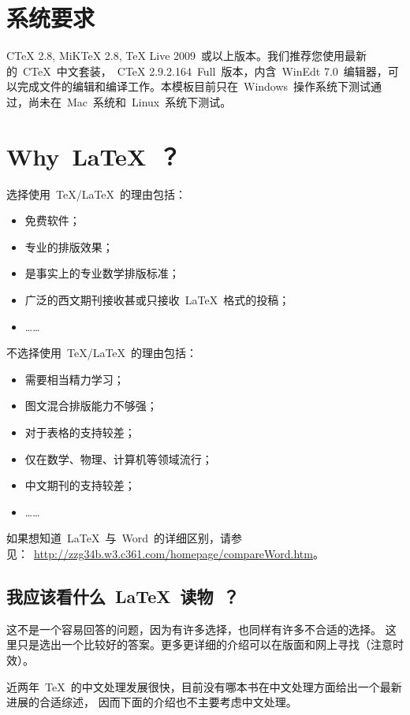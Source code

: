 \section{系统要求}

     CTeX 2.8, MiKTeX 2.8, TeX Live 2009~或以上版本。我们推荐您使用最新的~CTeX~中文套装，~CTeX 2.9.2.164~Full~版本，内含~WinEdt 7.0~编辑器，可以完成文件的编辑和编译工作。本模板目前只在~Windows~操作系统下测试通过，尚未在~Mac~系统和~Linux~系统下测试。

\section{Why~\LaTeX~？}

选择使用~\TeX/\LaTeX~的理由包括：
\begin{itemize}
\item 免费软件；
\item 专业的排版效果；
\item 是事实上的专业数学排版标准；
\item 广泛的西文期刊接收甚或只接收~\LaTeX~格式的投稿；
\item[] ……
\end{itemize}
不选择使用~\TeX/\LaTeX~的理由包括：
\begin{itemize}
\item 需要相当精力学习；
\item 图文混合排版能力不够强；
\item 对于表格的支持较差；
\item 仅在数学、物理、计算机等领域流行；
\item 中文期刊的支持较差；
\item[] ……
\end{itemize}

如果想知道~\LaTeX~与~Word~的详细区别，请参见：~\url{http://zzg34b.w3.c361.com/homepage/compareWord.htm}。

\subsection{我应该看什么~\LaTeX~读物~？}

这不是一个容易回答的问题，因为有许多选择，也同样有许多不合适的选择。
这里只是选出一个比较好的答案。更多更详细的介绍可以在版面和网上寻找（注意时效）。

近两年~\TeX~的中文处理发展很快，目前没有哪本书在中文处理方面给出一个最新进展的合适综述，
因而下面的介绍也不主要考虑中文处理。

